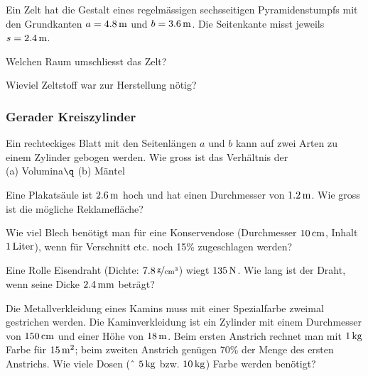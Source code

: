 \documentclass[%
11pt,%
twoside,%
titlepage,%
a4page,%
german,%
headsepline%
]{scrartcl}
\begin{document}
\begin{ueb}
Ein Zelt hat die Gestalt eines regelm\"assigen sechsseitigen Pyramidenstumpfs mit den Grundkanten $a=\unit[4.8]{m}$ und $b=\unit[3.6]{m}$. Die Seitenkante misst jeweils $s=\unit[2.4]{m}$.
\begin{enumeratea}
\item Welchen Raum umschliesst das Zelt?
\item Wieviel Zeltstoff war zur Herstellung n\"otig?
\end{enumeratea}
\end{ueb}

\subsubsection{Gerader Kreiszylinder}
\begin{ueb}
Ein rechteckiges Blatt mit den Seitenl\"angen $a$ und $b$ kann auf zwei Arten zu einem Zylinder gebogen werden. Wie gross ist das Verh\"altnis der \\[1ex]
\hspace*{2.7ex}(a) Volumina$\q$ (b) M\"antel
\end{ueb}

\begin{ueb}
Eine Plakats\"aule ist $\unit[2.6]{m}$ hoch und hat einen Durchmesser von $\unit[1.2]{m}$. Wie gross ist die m\"ogliche Reklamefl\"ache?
\end{ueb}

\begin{ueb}
Wie viel Blech ben\"otigt man f\"ur eine Konservendose (Durchmesser $\unit[10]{cm}$, Inhalt $\unit[1]{Liter}$), wenn f\"ur Verschnitt etc. noch 15\% zugeschlagen werden?
\end{ueb}

\begin{ueb}
Eine Rolle Eisendraht (Dichte: $\unitfrac[7.8]{g}{cm^3}$) wiegt $\unit[135]{N}$. Wie lang ist der Draht, wenn seine Dicke $\unit[2.4]{mm}$ betr\"agt?
\end{ueb}

\begin{ueb}
Die Metallverkleidung eines Kamins muss mit einer Spezialfarbe zweimal gestrichen werden. Die Kaminverkleidung ist ein Zylinder mit einem Durchmesser von $\unit[150]{cm}$ und einer H\"ohe von $\unit[18]{m}$. Beim ersten Anstrich rechnet man mit $\unit[1]{kg}$ Farbe f\"ur $\unit[15]{m^2}$; beim zweiten Anstrich gen\"ugen 70\% der Menge des ersten Anstrichs. Wie viele Dosen (ˆ $\unit[5]{kg}$ bzw. $\unit[10]{kg}$) Farbe werden ben\"otigt?
\end{ueb}
\end{document}
